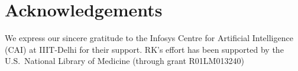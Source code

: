 \documentclass[letterpaper]{article} %
\begin{document}
\section*{Acknowledgements}
We express our sincere gratitude to the Infosys Centre for Artificial Intelligence (CAI) at IIIT-Delhi for their  support. RK's effort has been supported by the U.S.~National Library of Medicine (through grant R01LM013240)





\end{document}
